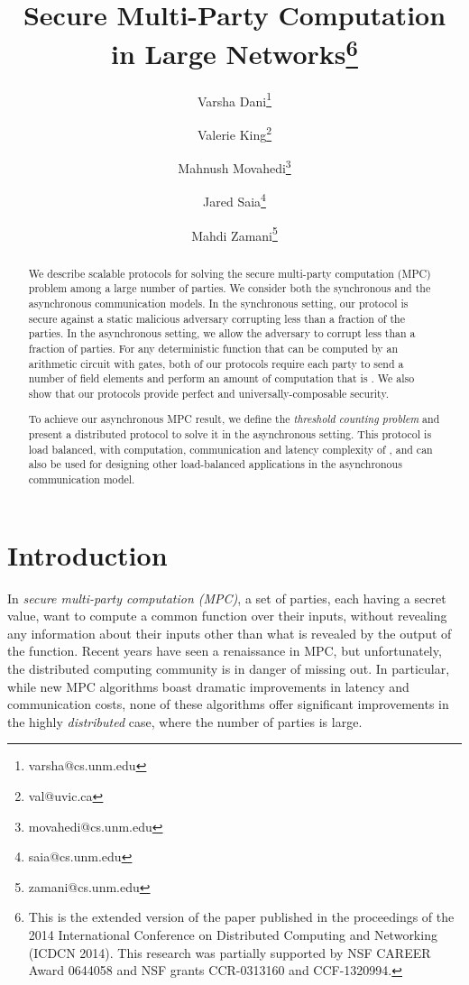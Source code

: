 \documentclass[11pt,letter]{article}
\author[1]{\normalsize Varsha Dani\thanks{varsha@cs.unm.edu}}
\author[2]{Valerie King\thanks{val@uvic.ca}}
\author[1]{Mahnush Movahedi\thanks{movahedi@cs.unm.edu}}
\author[1]{Jared Saia\thanks{saia@cs.unm.edu}}
\author[1]{Mahdi Zamani\thanks{zamani@cs.unm.edu}}
\affil[1]{Department of Computer Science, University of New Mexico, Albuquerque, NM, USA\vspace{3pt}}
\affil[2]{Department of Computer Science, University of Victoria, Victoria, BC, Canada}
\theoremstyle{mytheoremstyle}
\newcommand{\papertitle}{Secure Multi-Party Computation in Large Networks}
\begin{document}
\title{\papertitle\thanks{This is the extended version of the paper published in the proceedings of the 2014 International Conference on Distributed Computing and Networking (ICDCN 2014). This research was partially supported by NSF CAREER Award 0644058 and NSF grants CCR-0313160 and CCF-1320994.}}


\sloppy		

\maketitle
\begin{abstract}
We describe scalable protocols for solving the secure multi-party computation (MPC) problem among a large number of parties. We consider both the synchronous and the asynchronous communication models. In the synchronous setting, our protocol is secure against a static malicious adversary corrupting less than a  fraction of the parties. In the asynchronous setting, we allow the adversary to corrupt less than a  fraction of parties. For any deterministic function that can be computed by an arithmetic circuit with  gates, both of our protocols require each party to send a number of field elements and perform an amount of computation that is . We also show that our protocols provide perfect and universally-composable security.

\vspace{-1pt}
To achieve our asynchronous MPC result, we define the \emph{threshold counting problem} and present a distributed protocol to solve it in the asynchronous setting. This protocol is load balanced, with computation, communication and latency complexity of , and can also be used for designing other load-balanced applications in the asynchronous communication model.
\end{abstract}

\section{Introduction}
In \emph{secure multi-party computation (MPC)}, a set of parties, each having a secret value, want to compute a common function over their inputs, without revealing any information about their inputs other than what is revealed by the output of the function.
Recent years have seen a renaissance in MPC, but unfortunately, the distributed computing community is in danger of missing out. In particular, while new MPC algorithms boast dramatic improvements in latency and communication costs, none of these algorithms offer significant improvements in the highly \emph{distributed} case, where the number of parties is large.
\end{document}
